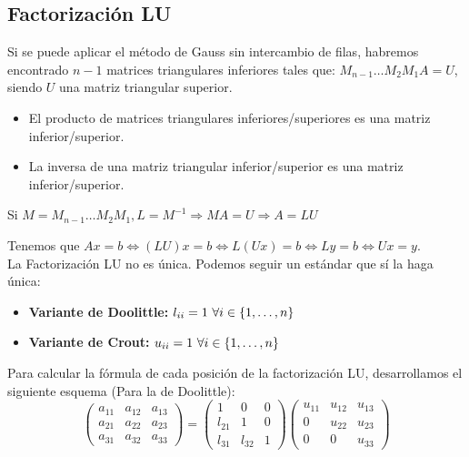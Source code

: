 \subsection{Factorización LU}
\noindent
Si se puede aplicar el método de Gauss sin intercambio de filas, habremos encontrado $n-1$ matrices triangulares
inferiores tales que: $M_{n-1} \ldots M_2 M_1 A = U$, siendo $U$ una matriz triangular superior.

\begin{itemize}
    \item El producto de matrices triangulares inferiores/superiores es una matriz inferior/superior.
    \item La inversa de una matriz triangular inferior/superior es una matriz inferior/superior.
\end{itemize}

Si $M=M_{n-1} \ldots M_2 M_1, L=M^{-1} \Rightarrow MA=U \Rightarrow A=LU$

Tenemos que $Ax=b \Leftrightarrow (LU)x=b \Leftrightarrow L(Ux)=b \Leftrightarrow Ly=b \Leftrightarrow Ux=y$.\\

\bigskip
\noindent
La Factorización LU no es única. Podemos seguir un estándar que sí la haga única:
\begin{itemize}
    \item \textbf{Variante de Doolittle:} $l_{ii}=1 \ \forall i \in \{1, \ldots, n\}$
    \item \textbf{Variante de Crout:} $u_{ii}=1 \ \forall i \in \{1, \ldots, n\}$
\end{itemize}

\noindent
Para calcular la fórmula de cada posición de la factorización LU, desarrollamos el siguiente esquema (Para la de Doolittle):
$$
    \left(
    \begin{array}{ccc}
            a_{11} & a_{12} & a_{13} \\
            a_{21} & a_{22} & a_{23} \\
            a_{31} & a_{32} & a_{33}
        \end{array}
    \right) =
    \left(
    \begin{array}{ccc}
            1      & 0      & 0 \\
            l_{21} & 1      & 0 \\
            l_{31} & l_{32} & 1
        \end{array}
    \right)
    \left(
    \begin{array}{ccc}
            u_{11} & u_{12} & u_{13} \\
            0      & u_{22} & u_{23} \\
            0      & 0      & u_{33}
        \end{array}
    \right)
$$

